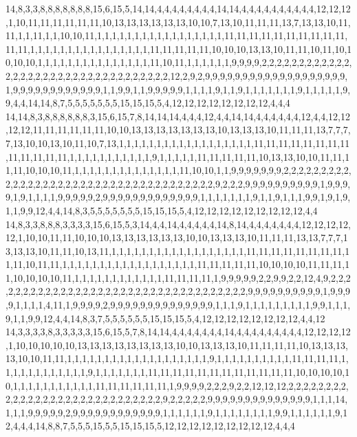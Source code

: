 14,8,3,3,8,8,8,8,8,8,8,15,6,15,5,14,14,4,4,4,4,4,4,4,4,14,14,4,4,4,4,4,4,4,4,4,4,12,12,12,1,10,11,11,11,11,11,11,10,13,13,13,13,13,13,10,10,7,13,10,11,11,11,13,7,13,13,10,11,11,1,1,11,1,1,10,10,11,1,1,1,1,1,1,1,1,1,1,1,1,1,1,1,1,1,11,11,11,11,11,11,11,11,11,11,11,11,1,1,1,1,1,1,1,1,1,1,1,1,1,1,1,1,11,11,11,11,11,10,10,10,13,13,10,11,11,10,11,10,10,10,10,1,1,1,1,1,1,1,1,1,1,1,1,1,1,1,11,10,11,1,1,1,1,1,1,9,9,9,9,2,2,2,2,2,2,2,2,2,2,2,2,2,2,2,2,2,2,2,2,2,2,2,2,2,2,2,2,2,2,2,2,2,2,12,2,9,2,9,9,9,9,9,9,9,9,9,9,9,9,9,9,9,9,9,9,9,1,9,9,9,9,9,9,9,9,9,9,9,9,1,1,9,9,1,1,9,9,9,9,9,1,1,1,1,9,1,1,9,1,1,1,1,1,1,1,9,1,1,1,1,1,9,9,4,4,14,14,8,7,5,5,5,5,5,5,5,15,15,15,5,4,12,12,12,12,12,12,12,12,4,4,4
14,14,8,3,8,8,8,8,8,8,3,15,6,15,7,8,14,14,14,4,4,4,12,4,4,14,14,4,4,4,4,4,4,12,4,4,12,12,12,12,11,11,11,11,11,11,10,10,13,13,13,13,13,13,13,10,13,13,13,10,11,11,11,13,7,7,7,7,13,10,10,13,10,11,10,7,13,1,1,1,1,1,1,1,1,1,1,1,1,1,1,1,1,1,1,11,11,11,11,11,11,11,11,11,11,11,11,11,1,1,1,1,1,1,1,1,1,1,1,9,1,1,1,1,1,11,11,11,11,11,10,13,13,10,10,11,11,11,11,10,10,10,11,1,1,1,1,1,1,1,1,1,1,1,1,1,1,11,10,10,1,1,9,9,9,9,9,9,9,2,2,2,2,2,2,2,2,2,2,2,2,2,2,2,2,2,2,2,2,2,2,2,2,2,2,2,2,2,2,2,2,2,2,2,2,2,9,2,2,2,9,9,9,9,9,9,9,9,9,9,1,9,9,9,9,1,9,1,1,1,1,9,9,9,9,9,2,9,9,9,9,9,9,9,9,9,9,9,9,9,1,1,1,1,1,1,1,9,1,1,9,1,1,1,9,9,1,9,1,9,1,1,9,9,12,4,4,14,8,3,5,5,5,5,5,5,5,15,15,15,5,4,12,12,12,12,12,12,12,12,12,4,4
14,8,3,3,8,8,8,3,3,3,3,15,6,15,5,3,14,4,4,14,4,4,4,4,4,14,8,14,4,4,4,4,4,4,4,12,12,12,12,12,1,10,10,11,11,10,10,10,13,13,13,13,13,13,10,10,13,13,13,10,11,11,11,13,13,7,7,7,13,13,13,10,11,11,10,13,11,1,1,1,1,1,1,1,1,1,1,1,1,1,1,1,1,1,1,11,11,11,11,11,11,11,11,11,11,10,11,11,1,1,1,1,1,1,1,1,1,1,1,1,1,1,1,1,1,1,11,11,11,11,11,10,10,10,10,11,11,11,11,10,10,10,10,11,1,1,1,1,1,1,1,1,1,1,1,1,11,11,11,11,1,9,9,9,9,9,2,2,9,9,2,2,12,4,9,2,2,2,2,2,2,2,2,2,2,2,2,2,2,2,2,2,2,2,2,2,2,2,2,2,2,2,2,2,2,2,2,2,2,2,9,9,9,9,9,9,9,9,9,9,1,9,9,9,9,1,1,1,1,4,11,1,9,9,9,9,2,9,9,9,9,9,9,9,9,9,9,9,9,9,9,1,1,1,9,1,1,1,1,1,1,1,1,1,9,9,1,1,1,9,1,1,9,9,12,4,4,14,8,3,7,5,5,5,5,5,5,15,15,15,5,4,12,12,12,12,12,12,12,12,4,4,12
14,3,3,3,3,8,3,3,3,3,3,15,6,15,5,7,8,14,14,4,4,4,4,4,4,4,14,4,4,4,4,4,4,4,4,4,12,12,12,12,1,10,10,10,10,10,13,13,13,13,13,13,13,13,10,10,13,13,13,10,11,11,11,11,10,13,13,13,13,10,10,11,11,1,1,1,1,1,1,1,1,1,1,1,1,1,1,1,1,1,1,1,9,1,1,1,1,1,1,1,1,1,1,11,11,11,11,1,1,1,1,1,1,1,1,1,1,1,1,9,1,1,1,1,1,1,1,11,11,11,11,11,11,11,11,11,11,11,11,10,10,10,10,10,1,1,1,1,1,1,1,1,1,1,1,11,11,11,11,11,11,1,9,9,9,9,2,2,2,9,2,2,12,12,12,2,2,2,2,2,2,2,2,2,2,2,2,2,2,2,2,2,2,2,2,2,2,2,2,2,2,2,2,2,9,2,2,2,2,2,9,9,9,9,9,9,9,9,9,9,9,9,9,9,1,1,1,14,1,1,1,9,9,9,9,9,2,9,9,9,9,9,9,9,9,9,9,9,9,1,1,1,1,1,1,9,1,1,1,1,1,1,1,1,9,9,1,1,1,1,1,1,9,12,4,4,4,14,8,8,7,5,5,5,15,5,5,15,15,15,5,12,12,12,12,12,12,12,12,12,4,4,4
